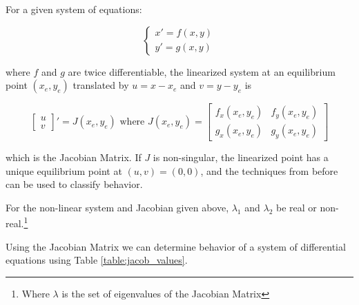     \begin{thm}[Jacobian]
        For a given system of equations:

            \[
                \begin{cases}
                    x\prime = f(x, y)\\
                    y\prime = g(x, y)
                \end{cases}
            \]

        where $f$ and $g$ are twice differentiable, the linearized system at an equilibrium point $(x_e, y_e)$ translated by $u = x - x_e$ and $v = y - y_e$ is

            \begin{equation}\label{eq:jacobian}
                \left[ \begin{array}{c}
                    u\\
                    v
                \end{array} \right] \prime = J(x_e, y_e) \text{ where } J(x_e, y_e) = 
                \left[ \begin{array}{cc}
                    f_x(x_e, y_e) & f_y(x_e, y_e)\\
                    g_x(x_e, y_e) & g_y(x_e, y_e)
                \end{array} \right]
            \end{equation}

        which is the Jacobian Matrix. If $J$ is non-singular, the linearized point has a unique equilibrium point at $(u, v) = (0,0)$, and the techniques from before can be used to classify behavior.

        For the non-linear system and Jacobian given above, $\lambda_1$ and $\lambda_2$ be real or non-real.\footnote{Where $\lambda$ is the set of eigenvalues of the Jacobian Matrix}
    \end{thm}

    Using the Jacobian Matrix we can determine behavior of a system of differential equations using Table \eqref{table:jacob_values}.

